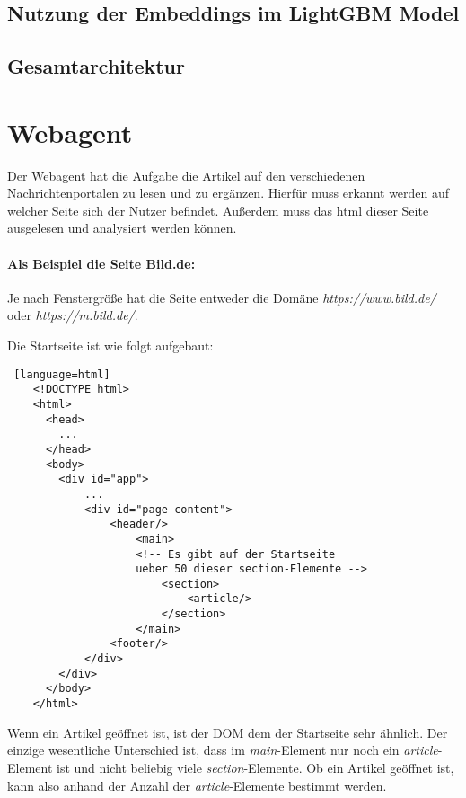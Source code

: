 \subsection{Nutzung der Embeddings im LightGBM Model}



\subsection{Gesamtarchitektur}


\section{Webagent} \label{sec:06:hauptkomponente}

Der Webagent hat die Aufgabe die Artikel auf den verschiedenen Nachrichtenportalen zu lesen und zu ergänzen.
Hierfür muss erkannt werden auf welcher Seite sich der Nutzer befindet. Außerdem muss das html dieser Seite ausgelesen und analysiert werden können.

\paragraph{Als Beispiel die Seite Bild.de:} 
Je nach Fenstergröße hat die Seite entweder die Domäne \textit{https://www.bild.de/} oder \textit{https://m.bild.de/}.

Die Startseite ist wie folgt aufgebaut:

\begin{lstlisting} [language=html]
    <!DOCTYPE html>
    <html>
      <head>
        ...
      </head>
      <body>
        <div id="app">
            ...
            <div id="page-content">
                <header/>
                    <main>
                    <!-- Es gibt auf der Startseite 
                    ueber 50 dieser section-Elemente -->
                        <section>
                            <article/>
                        </section>
                    </main>
                <footer/>
            </div>    
        </div>
      </body>
    </html>
\end{lstlisting}

Wenn ein Artikel geöffnet ist, ist der DOM dem der Startseite sehr ähnlich. Der einzige wesentliche Unterschied ist, dass im \textit{main}-Element
nur noch ein \textit{article}-Element ist und nicht beliebig viele \textit{section}-Elemente.
Ob ein Artikel geöffnet ist, kann also anhand der Anzahl der \textit{article}-Elemente bestimmt werden.


